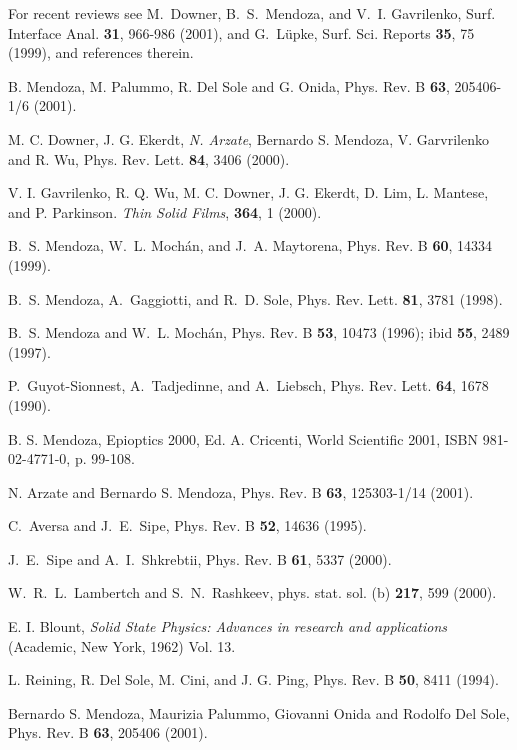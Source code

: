 \documentclass[floatfix,prb,aps,superscriptaddress,11pt,preprint]{revtex4}
\begin{document}
\begin{thebibliography}{99}

 For recent reviews see M.~Downer, B.~S.~Mendoza, and
V.~I. Gavrilenko, Surf. Interface Anal. {\bf 31}, 966-986 (2001), and
G.~L\"upke,  Surf. Sci. Reports {\bf 35},  75
(1999), and references therein.

 B. Mendoza, M. Palummo, R. Del Sole and
G. Onida,
Phys. Rev. B
{\bf 63}, 205406-1/6 (2001).

M. C. Downer, J. G. Ekerdt, {\it N. Arzate}, Bernardo S.
Mendoza, V. Garvrilenko and R. Wu,  Phys. Rev. Lett.
{\bf 84}, 3406 (2000).

 V. I. Gavrilenko, R. Q. Wu, M. C. Downer, J. G. Ekerdt,
D. Lim,  L. Mantese, and P. Parkinson. {\it Thin Solid Films},  {\bf
364}, 1 (2000).

B.~S. Mendoza,  W.~L. Moch\'an,
and J.~A.  Maytorena, Phys. Rev. B  {\bf 60}, 14334 (1999).

B.~S. Mendoza,  A.~Gaggiotti,  and R.~D. Sole,
Phys. Rev. Lett. {\bf 81},  3781 (1998).

 B.~S. Mendoza and  W.~L. Moch\'an,  Phys. Rev. B
{\bf 53},  10473 (1996); ibid
{\bf 55},  2489 (1997).

 P.~Guyot-Sionnest,  A.~Tadjedinne,
and A.~Liebsch,  Phys. Rev. Lett.  {\bf 64}, 1678  (1990).

B. S. Mendoza,
Epioptics 2000,
Ed. A. Cricenti, World Scientific 2001,
ISBN 981-02-4771-0,
p. 99-108.

 N. Arzate and Bernardo S. Mendoza,
Phys. Rev. B {\bf 63}, 125303-1/14 (2001).

 C.~Aversa and J.~E.~Sipe, Phys. Rev. B {\bf 52}, 14636
(1995).

 J.~E.~Sipe and A.~I.~Shkrebtii, Phys. Rev. B {\bf 61},
5337 (2000).

 W.~R.~L.~Lambertch and S.~N.~Rashkeev, phys. stat.
sol. (b) {\bf 217}, 599 (2000).


E. I. Blount, {\it Solid State Physics: Advances in
  research and applications} (Academic, New York, 1962) Vol. 13.

L. Reining, R. Del Sole, M. Cini, and J. G. Ping,
Phys. Rev. B {\bf 50}, 8411 (1994).

Bernardo S. Mendoza, Maurizia Palummo, Giovanni Onida and Rodolfo Del Sole,
Phys. Rev. B
{\bf 63}, 205406 (2001).


\end{thebibliography}
\end{document}
